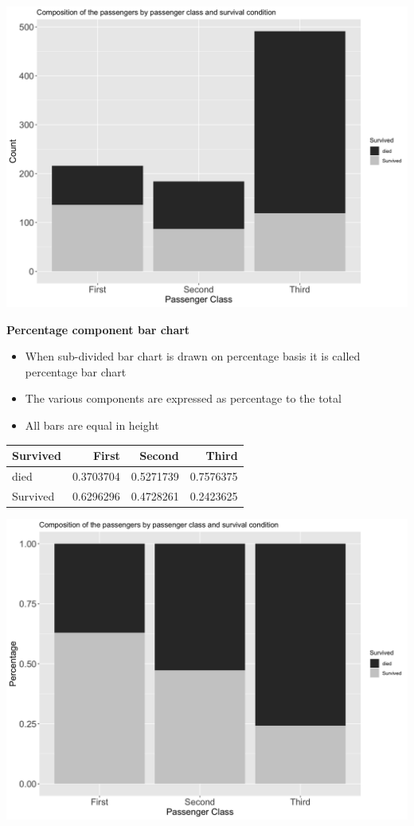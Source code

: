 \documentclass[]{book}
\providecommand{\tightlist}{%
  \setlength{\itemsep}{0pt}\setlength{\parskip}{0pt}}
\begin{document}
\begin{center}\includegraphics[width=0.8\linewidth]{figure/box10-1} \end{center}

\textbf{Percentage component bar chart}

\begin{itemize}
\tightlist
\item
  When sub-divided bar chart is drawn on percentage basis it is called percentage bar chart
\item
  The various components are expressed as percentage to the total
\item
  All bars are equal in height
\end{itemize}

\begin{tabular}{l|r|r|r}
\hline
Survived & First & Second & Third\\
\hline
died & 0.3703704 & 0.5271739 & 0.7576375\\
\hline
Survived & 0.6296296 & 0.4728261 & 0.2423625\\
\hline
\end{tabular}

\begin{center}\includegraphics[width=0.8\linewidth]{figure/box11-1} \end{center}
\end{document}
